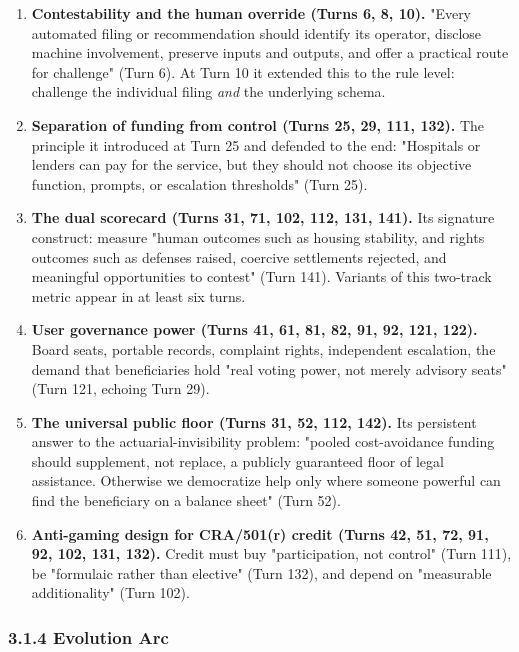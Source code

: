 \documentclass[sigconf,nonacm=true]{acmart}
\begin{document}
\begin{enumerate}[nosep]
\item \textbf{Contestability and the human override (Turns 6, 8, 10).} "Every automated filing or recommendation should identify its operator, disclose machine involvement, preserve inputs and outputs, and offer a practical route for challenge" (Turn 6). At Turn 10 it extended this to the rule level: challenge the individual filing \textit{and} the underlying schema.
\item \textbf{Separation of funding from control (Turns 25, 29, 111, 132).} The principle it introduced at Turn 25 and defended to the end: "Hospitals or lenders can pay for the service, but they should not choose its objective function, prompts, or escalation thresholds" (Turn 25).
\item \textbf{The dual scorecard (Turns 31, 71, 102, 112, 131, 141).} Its signature construct: measure "human outcomes such as housing stability, and rights outcomes such as defenses raised, coercive settlements rejected, and meaningful opportunities to contest" (Turn 141). Variants of this two-track metric appear in at least six turns.
\item \textbf{User governance power (Turns 41, 61, 81, 82, 91, 92, 121, 122).} Board seats, portable records, complaint rights, independent escalation,  the demand that beneficiaries hold "real voting power, not merely advisory seats" (Turn 121, echoing Turn 29).
\item \textbf{The universal public floor (Turns 31, 52, 112, 142).} Its persistent answer to the actuarial-invisibility problem: "pooled cost-avoidance funding should supplement, not replace, a publicly guaranteed floor of legal assistance. Otherwise we democratize help only where someone powerful can find the beneficiary on a balance sheet" (Turn 52).
\item \textbf{Anti-gaming design for CRA/501(r) credit (Turns 42, 51, 72, 91, 92, 102, 131, 132).} Credit must buy "participation, not control" (Turn 111), be "formulaic rather than elective" (Turn 132), and depend on "measurable additionality" (Turn 102).

\end{enumerate}
\subsubsection{3.1.4 Evolution Arc}
\end{document}
